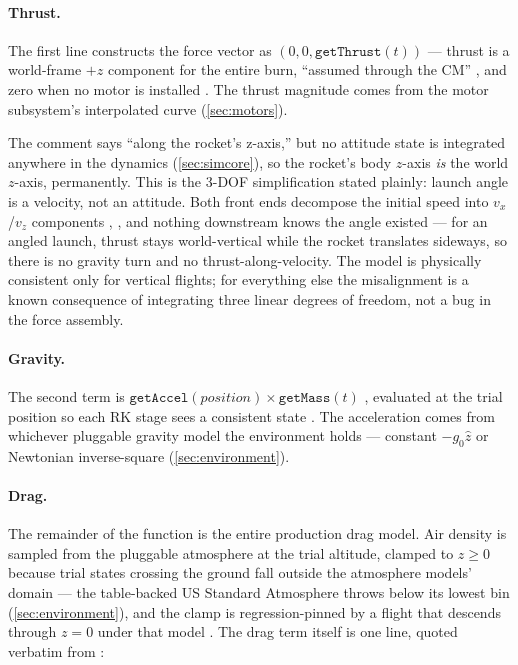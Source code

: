 \paragraph{Thrust.} The first line constructs the force vector as
$(0, 0, \mathtt{getThrust}(t))$ --- thrust is a world-frame $+z$ component for the entire
burn, ``assumed through the CM'' , and zero when no motor is
installed . The thrust magnitude comes from the motor
subsystem's interpolated curve (\cref{sec:motors}).

\begin{keyinsight}
The comment says ``along the rocket's z-axis,'' but no attitude state is integrated anywhere
in the dynamics (\cref{sec:simcore}), so the rocket's body $z$-axis \emph{is} the world
$z$-axis, permanently. This is the 3-DOF simplification stated plainly: launch angle is a
velocity, not an attitude. Both front ends decompose the initial speed into $v_x$/$v_z$
components , , and nothing downstream
knows the angle existed --- for an angled launch, thrust stays world-vertical while the
rocket translates sideways, so there is no gravity turn and no thrust-along-velocity. The
model is physically consistent only for vertical flights; for everything else the
misalignment is a known consequence of integrating three linear degrees of freedom, not a
bug in the force assembly.
\end{keyinsight}

\paragraph{Gravity.} The second term is
$\mathtt{getAccel}(\mathit{position}) \times \mathtt{getMass}(t)$
, evaluated at the trial position so each RK stage sees a
consistent state . The acceleration comes from whichever
pluggable gravity model the environment holds --- constant $-g_0\hat{z}$ or Newtonian
inverse-square (\cref{sec:environment}).

\paragraph{Drag.} The remainder of the function is the entire production drag model. Air
density is sampled from the pluggable atmosphere at the trial altitude, clamped to
$z \ge 0$ because trial states crossing the ground fall outside the atmosphere models'
domain  --- the table-backed US Standard Atmosphere throws
below its lowest bin (\cref{sec:environment}), and the clamp is regression-pinned by a
flight that descends through $z = 0$ under that model
. The drag term itself is one line, quoted
verbatim from :

